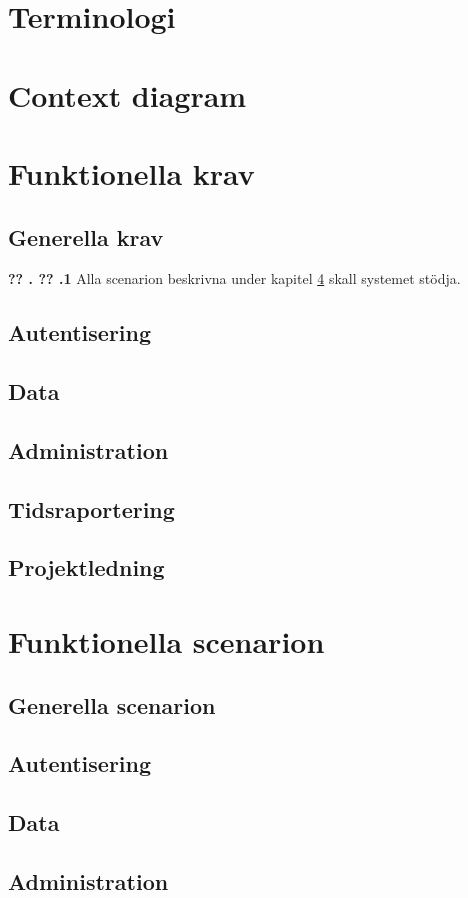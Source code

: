 \documentclass[a4paper]{article}
\newcommand\getcurrentref[1]{%
 \ifnumequal{\value{#1}}{0}
  {??}
  {\the\value{#1}}%
}
\newcommand\requirement[2]{
	\textbf{\getcurrentref{section}.\getcurrentref{subsection}.#1} #2

}
\begin{document}
\section{Terminologi}
\section{Context diagram}
\section{Funktionella krav}
\subsection{Generella krav}
 \requirement{1}{Alla scenarion beskrivna under kapitel \ref{scenarion} skall systemet stödja.}
\subsection{Autentisering}
\subsection{Data}
\subsection{Administration}
\subsection{Tidsraportering}
\subsection{Projektledning}
\section{Funktionella scenarion}
\label{scenarion}
\subsection{Generella scenarion}
\subsection{Autentisering}
\subsection{Data}
\subsection{Administration}
\end{document}
